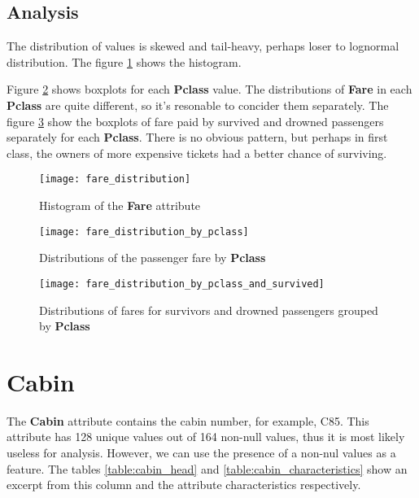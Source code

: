 \subsection{Analysis}
The distribution of values is skewed and tail-heavy, perhaps loser to 
lognormal distribution. The figure \ref{pic:fare_distribution} shows the
histogram.

Figure \ref{pic:fare_distribution_by_pclass} shows boxplots for
each \textbf{Pclass} value. The distributions of \textbf{Fare} in each
\textbf{Pclass} are quite different, so it's resonable to concider them 
separately. The figure \ref{pic:fare_distribution_by_pclass_and_survived}
show the boxplots of fare paid by survived and drowned passengers 
separately for each \textbf{Pclass}. There is no obvious pattern, but 
perhaps in first class, the owners of more expensive tickets had a better 
chance of surviving.

\begin{figure}[!hp]
    \centering
    \texttt{[image: fare\_distribution]}
    \caption{Histogram of the \textbf{Fare} attribute}
    \label{pic:fare_distribution}
\end{figure}

\begin{figure}[!hp]
    \centering
    \texttt{[image: fare\_distribution\_by\_pclass]}
    \caption{Distributions of the passenger fare by \textbf{Pclass}}
    \label{pic:fare_distribution_by_pclass}
\end{figure}

\begin{figure}[!hp]
    \centering
    \texttt{[image: fare\_distribution\_by\_pclass\_and\_survived]}
    \caption{Distributions of fares for survivors and drowned passengers grouped by \textbf{Pclass}}
    \label{pic:fare_distribution_by_pclass_and_survived} 
\end{figure}


\section{Cabin} \label{section:Cabin}
The \textbf{Cabin} attribute contains the cabin number, for example, C85.
This attribute has 128 unique values out of 164 non-null values, thus it 
is most likely useless for analysis. However, we can use the presence of
a non-nul values as a feature. The tables \ref{table:cabin_head} and 
\ref{table:cabin_characteristics} show an excerpt from this column and 
the attribute characteristics respectively.

